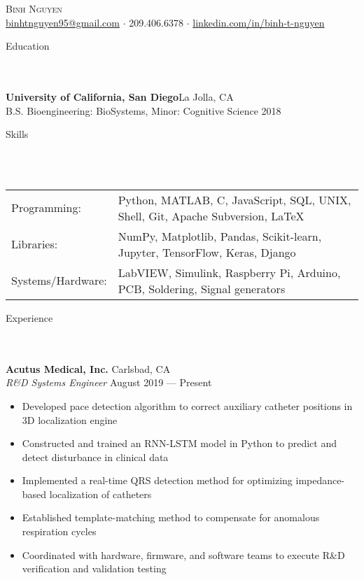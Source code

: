 \documentclass{article}
\newcommand{\lineunder} {
    \vspace*{-8pt} \\
    \hspace*{-18pt} \hrulefill \\
}
\newcommand{\header} [1] {
    {\hspace*{-18pt}\vspace*{6pt} \Large{#1} }
    \vspace*{-6pt} 
    \lineunder
}
\begin{document}
\vspace*{-40pt}

  

\begin{center}
	{\Huge \scshape {Binh Nguyen}}\\
	\vspace{2mm}
	\href{mailto:binhtnguyen95@gmail.com}{binhtnguyen95@gmail.com} $\cdot$ 
	209.406.6378 $\cdot$ 
	\href{https://www.linkedin.com/in/binh-t-nguyen}{linkedin.com/in/binh-t-nguyen} 
\end{center}

\header{Education}
\textbf{University of California, San Diego}\hfill La Jolla, CA\\
B.S. Bioengineering: BioSystems, Minor: Cognitive Science \hfill 2018\\
\vspace{7mm}

\header{Skills}
\vspace{1mm}
\begin{tabular}{ l l }
	Programming: & Python, MATLAB, C, JavaScript, SQL, UNIX, Shell, Git, Apache Subversion, \LaTeX \\
	Libraries:   & NumPy, Matplotlib, Pandas, Scikit-learn, Jupyter, TensorFlow, Keras, Django \\
	Systems/Hardware:    & LabVIEW, Simulink, Raspberry Pi, Arduino, PCB, Soldering, Signal generators  \\
\end{tabular}
\vspace{5mm}

\header{Experience}

\textbf{Acutus Medical, Inc.} \hfill Carlsbad, CA\\
\textit{R\&D Systems Engineer} \hfill August 2019 --- Present\\
\vspace{-2mm}
\begin{itemize} \itemsep 0.05pt
	\item Developed pace detection algorithm to correct auxiliary catheter positions in 3D localization engine
	\item Constructed and trained an RNN-LSTM model in Python to predict and detect disturbance in clinical data
	\item Implemented a real-time QRS detection method for optimizing impedance-based localization of catheters
	\item Established template-matching method to compensate for anomalous respiration cycles
	\item Coordinated with hardware, firmware, and software teams to execute R\&D verification and validation testing
\end{itemize}
\end{document}
